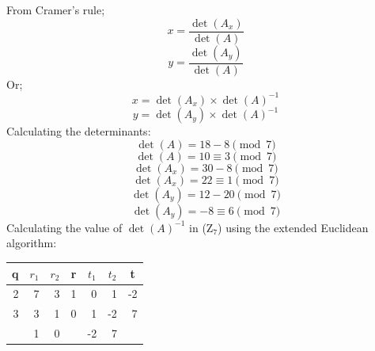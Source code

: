 \documentclass[a4paper]{exam}
\begin{document}
\begin{questions}
\begin{solution}
\begin{parts}
                From Cramer's rule;
                \[
                    x = \frac{\det(A_x)}{\det(A)}
                \]
                \[
                    y = \frac{\det(A_y)}{\det(A)}
                \]
                Or;
                \[
                    x = \det(A_x) \times \det(A)^{-1}
                \]
                \[
                    y = \det(A_y) \times \det(A)^{-1}
                \]
                Calculating the determinants:
                \[
                    \det(A) = 18 - 8 \pmod{7}
                \]
                \[
                    \det(A) = 10 \equiv 3 \pmod{7}
                \]
                \[
                    \det(A_x) = 30 - 8 \pmod{7}
                \]
                \[
                    \det(A_x) = 22 \equiv 1 \pmod{7}
                \]
                \[
                    \det(A_y) = 12 - 20 \pmod{7}
                \]
                \[
                    \det(A_y) = -8 \equiv 6 \pmod{7}
                \]
                Calculating the value of $\det(A)^{-1}$ in ($\text{Z}_{7}$) using the extended Euclidean algorithm:
                \begin{table}[H]
                    \begin{center}
                        \begin{tabular}{|r|r|r|r|r|r|r|}
                            \hline
                            \multicolumn{1}{|c|}{\textbf{q}}               & \multicolumn{1}{c|}{\textbf{$r_1$}} & \multicolumn{1}{c|}{\textbf{$r_2$}} & \multicolumn{1}{c|}{\textbf{r}}               & \multicolumn{1}{c|}{\textbf{$t_1$}} & \multicolumn{1}{c|}{\textbf{$t_2$}} & \multicolumn{1}{c|}{\textbf{t}}               \\ \hline
                            2                                              & 7                                   & 3                                   & 1                                             & 0                                     & 1                                   & -2                                            \\ \hline
                            3                                              & 3                                   & 1                                   & 0                                             & 1                                     & -2                                  & 7                                             \\ \hline
                            \multicolumn{1}{|l|}{}                         & 1                                   & 0                                   & \multicolumn{1}{l|}{}                         & -2                                    & 7                                   & \multicolumn{1}{l|}{}                         \\ \hline

\end{tabular}
\end{center}
\end{table}
\end{parts}
\end{solution}
\end{questions}
\end{document}
